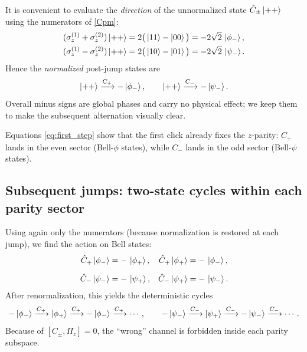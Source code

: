 \documentclass[12pt,a4paper]{article}
\begin{document}
	It is convenient to evaluate the \emph{direction} of the unnormalized state \(\hat{C}_\pm\ket{++}\) using the numerators of \eqref{Cpm}:
	\begin{align}
		(\sigma_z^{(1)}+\sigma_z^{(2)})\ket{++}
		&=2\big(\ket{11}-\ket{00}\big)
		=-2\sqrt{2}\,\ket{\phi_-},\label{eq:sigplus_on_pp}\\
		(\sigma_z^{(1)}-\sigma_z^{(2)})\ket{++}
		&=2\big(\ket{10}-\ket{01}\big)
		=-2\sqrt{2}\,\ket{\psi_-}.
		\label{eq:sigminus_on_pp}
	\end{align}
	Hence the \emph{normalized} post-jump states are
	\begin{equation}
		\ket{++}\xrightarrow{C_+}-\ket{\phi_-},
		\qquad
		\ket{++}\xrightarrow{C_-}-\ket{\psi_-}.
		\label{eq:first_step}
	\end{equation}
	Overall minus signs are global phases and carry no physical effect; we keep them to make the subsequent alternation visually clear.
	
	Equations \eqref{eq:first_step} show that the first click already fixes the $z$-parity: $C_+$ lands in the even sector (Bell-$\phi$ states), while $C_-$ lands in the odd sector (Bell-$\psi$ states).
	
	\subsection{Subsequent jumps: two-state cycles within each parity sector}
	Using again only the numerators (because normalization is restored at each jump), we find the action on Bell states:
	\begin{align}
		\hat{C}_+\ket{\phi_-}
		&=-\,\ket{\phi_+},&
		\hat{C}_+\ket{\phi_+}
		&=-\,\ket{\phi_-},\\[2mm]
		\hat{C}_-\ket{\psi_-}
		&=-\,\ket{\psi_+},&
		\hat{C}_-\ket{\psi_+}
		&=-\,\ket{\psi_-}.
	\end{align}
	After renormalization, this yields the deterministic cycles
	\begin{equation}
		-\ket{\phi_-}\xrightarrow{C_+}\ket{\phi_+}\xrightarrow{C_+}-\ket{\phi_-}\xrightarrow{C_+}\cdots,
		\qquad
		-\ket{\psi_-}\xrightarrow{C_-}\ket{\psi_+}\xrightarrow{C_-}-\ket{\psi_-}\xrightarrow{C_-}\cdots.
		\label{eq:cycles}
	\end{equation}
	Because of $[C_\pm,\Pi_z]=0$, the ``wrong'' channel is forbidden inside each parity subspace.
	
\end{document}
